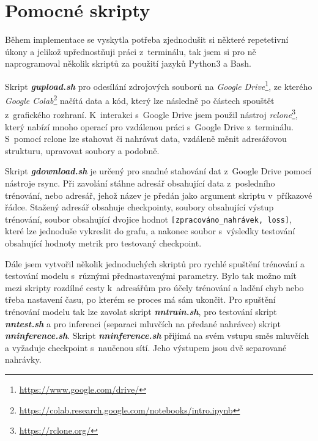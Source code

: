 %
%


\section{Pomocné skripty}
Během implementace se vyskytla potřeba zjednodušit si některé repetetivní úkony a jelikož upřednostňuji práci z~terminálu, tak jsem si pro ně naprogramoval několik skriptů za použití jazyků Python3 a Bash. 

Skript \textbf{\textit{gupload.sh}} pro odesílání zdrojových souborů na \textit{Google Drive}\footnote{\url{https://www.google.com/drive/}}, ze kterého \textit{Google Colab}\footnote{\url{https://colab.research.google.com/notebooks/intro.ipynb}} načítá data a kód, který lze následně po částech spouštět z~grafického rozhraní. K~interakci s~Google Drive jsem použil nástroj \textit{rclone}\footnote{\url{https://rclone.org/}}, který nabízí mnoho operací pro vzdálenou práci s~Google Drive z~terminálu. S~pomocí rclone lze stahovat či nahrávat data, vzdáleně měnit adresářovou strukturu, upravovat soubory a podobně. 

Skript \textbf{\textit{gdownload.sh}} je určený pro snadné stahování dat z~Google Drive pomocí nástroje rsync. Při zavolání stáhne adresář obsahující data z~posledního trénování, nebo adresář, jehož název je předán jako argument skriptu v~příkazové řádce.   
Stažený adresář obsahuje checkpointy, soubory obsahující výstup trénování, soubor obsahující dvojice hodnot \texttt{[zpracováno\_nahrávek, loss]}, které lze jednoduše vykreslit do grafu, a nakonec soubor s~výsledky testování obsahující hodnoty metrik pro testovaný checkpoint.

Dále jsem vytvořil několik jednoduchých skriptů pro rychlé spuštění trénování a testování modelu s~různými přednastavenými parametry. Bylo tak možno mít mezi skripty rozdílné cesty k~adresářům pro účely trénování a ladění chyb nebo třeba nastavení času, po kterém se proces má sám ukončit. Pro spuštění trénování modelu tak lze zavolat skript \textbf{\textit{nntrain.sh}}, pro testování skript \textbf{\textit{nntest.sh}} a pro inferenci (separaci mluvčích na předané nahrávce) skript \textbf{\textit{nninference.sh}}. Skript \textbf{\textit{nninference.sh}} přijímá na svém vstupu směs mluvčích a vyžaduje checkpoint s~naučenou sítí. Jeho výstupem jsou dvě separované nahrávky.


